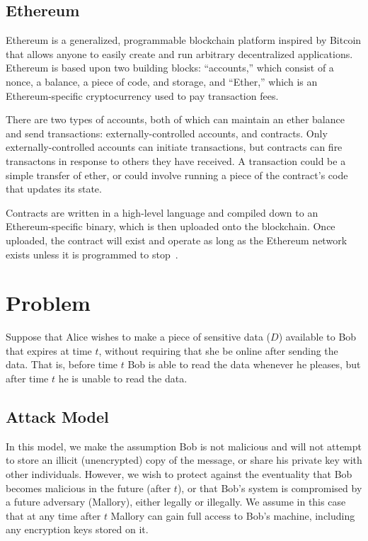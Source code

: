 \documentclass{article}
\begin{document}
\subsection{Ethereum}

Ethereum is a generalized, programmable blockchain platform inspired by Bitcoin that allows anyone to easily create and run arbitrary decentralized applications. Ethereum is based upon two building blocks: ``accounts,'' which consist of a nonce, a balance, a piece of code, and storage, and ``Ether,'' which is an Ethereum-specific cryptocurrency used to pay transaction fees.

There are two types of accounts, both of which can maintain an ether balance and send  transactions: externally-controlled accounts, and contracts. Only externally-controlled accounts can initiate transactions, but contracts can fire transactons in response to others they have received. A transaction could be a simple transfer of ether, or could involve running a piece of the contract's code that updates its state.

Contracts are written in a high-level language and compiled down to an Ethereum-specific binary, which is then uploaded onto the blockchain. Once uploaded, the contract will exist and operate as long as the Ethereum network exists unless it is programmed to stop~\cite{ethereum-white}.

\section{Problem}

Suppose that Alice wishes to make a piece of sensitive data ($D$) available to Bob that expires at time $t$, without requiring that she be online after sending the data. That is, before time $t$ Bob is able to read the data whenever he pleases, but after time $t$ he is unable to read the data. %

\subsection{Attack Model}

In this model, we make the assumption Bob is not malicious and will not attempt to store an illicit (unencrypted) copy of the message, or share his private key with other individuals. However, we wish to protect against the eventuality that Bob becomes malicious in the future (after $t$), or that Bob's system is compromised by a future adversary (Mallory), either legally or illegally. We assume in this case that at any time after $t$ Mallory can gain full access to Bob's machine, including any encryption keys stored on it.
\end{document}
